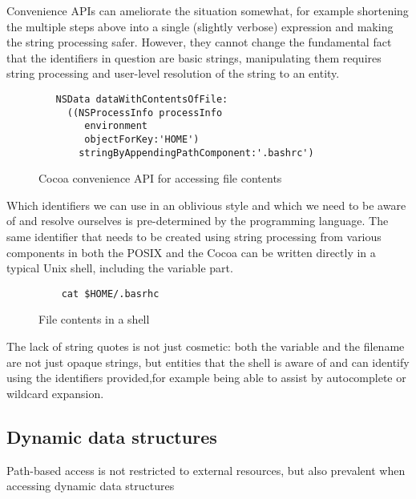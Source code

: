 \documentclass[preprint,authoryear]{acm_proc_article-sp}
\begin{document}
Convenience APIs can ameliorate the situation somewhat, for example shortening 
the multiple steps above into a single (slightly verbose) expression and making the
string processing safer.  However, they cannot
change the fundamental fact that the identifiers in question are basic strings,
manipulating them requires string processing and user-level resolution of the
string to an entity.

\begin{figure}[htbp]
\begin{center}
\begin{verbatim}
   NSData dataWithContentsOfFile:
     ((NSProcessInfo processInfo
        environment 
        objectForKey:'HOME') 
       stringByAppendingPathComponent:'.bashrc')

\end{verbatim}
\caption{Cocoa convenience API for accessing file contents}
\label{cocoa-file-contents}
\end{center}
\end{figure}


Which identifiers we can use in an oblivious style and which we need to
be aware of and resolve ourselves is pre-determined by the programming
language.
The same identifier that needs to be created using string processing from various
components in both the POSIX and the Cocoa can be written directly in a typical
Unix shell, including the variable part.

\begin{figure}[htbp]
\begin{center}
\begin{verbatim}
	cat $HOME/.basrhc
\end{verbatim}
\caption{File contents in a shell}
\label{sh-file-contents}
\end{center}
\end{figure}

The lack of string quotes is not just cosmetic: both the variable and the filename
are not just opaque strings, but entities that the shell is aware of and can identify
using the identifiers provided,for example being able to assist by autocomplete 
or wildcard expansion.



\subsection{Dynamic data structures}

Path-based access is not restricted to external resources, but also
prevalent when accessing dynamic data structures
\end{document}
